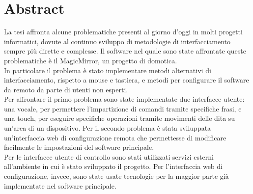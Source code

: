 \chapter*{Abstract}

La tesi affronta alcune problematiche presenti al giorno d'oggi in molti progetti informatici,
dovute al continuo sviluppo di metodologie di interfacciamento sempre pi\`u
dirette e complesse.
Il software nel quale sono state affrontate queste problematiche \`e il MagicMirror, un progetto di domotica.\\
In particolare il problema \`e stato implementare metodi alternativi di interfacciamento, rispetto a mouse e tastiera,
e metodi per configurare il software da remoto da parte di utenti non esperti.\\[1\baselineskip]
Per affrontare il primo problema sono state implementate due interfacce utente: una vocale, per permettere
l'impartizione di comandi tramite specifiche frasi, e una touch, per eseguire specifiche operazioni
tramite movimenti delle dita su un'area di un dispositivo.
Per il secondo problema \`e stata sviluppata un'interfaccia web di configurazione remota che permettesse di
modificare facilmente le impostazioni del software principale.\\[1\baselineskip]
Per le interfacce utente di controllo sono stati utilizzati servizi esterni
all'ambiente in cui \`e stato sviluppato il progetto. Per l'interfaccia web di configurazione, invece, sono state usate tecnologie
per la maggior parte gi\`a implementate nel software principale.
